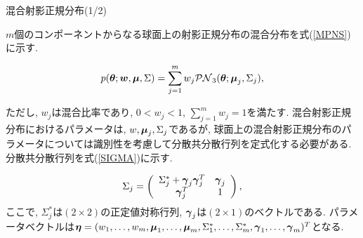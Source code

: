 \documentclass[dvipdfmx]{beamer} %
\newcommand{\bm}[1]{\mbox{\boldmath $#1$}}
\begin{document}
\begin{frame}{混合射影正規分布(1/2)}

$m$個のコンポーネントからなる球面上の射影正規分布の混合分布を式(\ref{MPNS})に示す. 

\vspace{-0.5cm}
\begin{eqnarray}
\label{MPNS}
p(\bm \theta;\bm w,\bm \mu, \Sigma) = \sum^m_{j=1} w_j \mathcal{PN}_3(\bm \theta;\bm \mu_j, \Sigma_j),
\end{eqnarray}

\noindent
ただし, $w_j$は混合比率であり, $0 < w_j < 1$, $\sum^m_{j=1} w_j = 1$を満たす. 混合射影正規分布におけるパラメータは, $w, \bm \mu_j, \Sigma_j$であるが, 球面上の混合射影正規分布のパラメータについては識別性を考慮して分散共分散行列を定式化する必要がある. 分散共分散行列を式(\ref{SIGMA})に示す.

\vspace{-0.5cm}
\begin{eqnarray}
\label{SIGMA}
 \Sigma_j = \left(
    \begin{array}{cc}
      \Sigma^*_j + \bm \gamma_j \bm \gamma_j^T & \bm \gamma_j \\
      \bm \gamma_j^T & 1
    \end{array}
  \right),
\end{eqnarray}
\noindent
ここで, $\Sigma^*_j$は$(2 \times 2)$の正定値対称行列, $\bm \gamma_j$は$(2 \times 1)$のベクトルである. パラメータベクトルは$\bm \eta = (w_1, \dots, w_m, \bm \mu_1, \dots, \bm \mu_m, \Sigma^*_1, \dots, \Sigma^*_m, \bm \gamma_1, \dots, \bm \gamma_m)^T$となる.

\end{frame}
\end{document}
